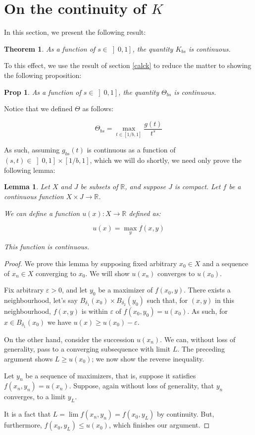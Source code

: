 \documentclass[11pt, reqno]{amsart}
\newcommand{\R}{\mathbb{R}}
\newtheorem{lemma}{Lemma}
\newtheorem{theorem}{Theorem}
\newtheorem{prop}{Prop}
\begin{document}
\section{On the continuity of $K$}

In this section, we present the following result:

\begin{theorem}
As a function of $s \in \left]0, 1\right]$, the quantity $K_{bs}$ is continuous.
\end{theorem}

To this effect, we use the result of section \ref{calck} to reduce the matter to showing the following proposition:

\begin{prop}
As a function of $s \in \left]0, 1\right]$, the quantity $\Theta_{bs}$ is continuous.
\end{prop}

Notice that we defined $\Theta$ as follows:

\[ \Theta_{bs} = \max_{t \in \left[ 1/b, 1 \right]} \frac{g(t)}{t^s} \]

As such, assuming $g_{bs}(t)$ is continuous as a function of $(s, t) \in \left]0, 1\right] \times \left[1/b, 1\right]$, which we will do shortly, we need only prove the following lemma:

\begin{lemma}
Let $X$ and $J$ be subsets of $\R$, and suppose $J$ is compact. Let $f$ be a continuous function $X \times J \to \R$.

We can define a function $u(x) : X \to \R$ defined as:

\[ u(x) = \max_y f(x,y) \]

This function is continuous.
\end{lemma}

\begin{proof}
We prove this lemma by supposing fixed arbitrary $x_0 \in X$ and a sequence of $x_n \in X$ converging to $x_0$. We will show $u(x_n)$ converges to $u(x_0)$.

Fix arbitrary $\varepsilon > 0$, and let $y_0$ be a maximizer of $f(x_0, y)$. There exists a neighbourhood, let's say $B_{\delta_1}(x_0) \times B_{\delta_2}(y_0)$ such that, for $(x,y)$ in this neighbourhood, $f(x,y)$ is within $\varepsilon$ of $f(x_0, y_0) = u(x_0)$. As such, for $x \in B_{\delta_1}(x_0)$ we have $u(x) \geq u(x_0) - \varepsilon$.

On the other hand, consider the succession $u(x_n)$. We can, without loss of generality, pass to a converging subsequence with limit $L$. The preceding argument shows $L \geq u(x_0)$; we now show the reverse inequality.

Let $y_n$ be a sequence of maximizers, that is, suppose it satisfies $f(x_n, y_n) = u(x_n)$. Suppose, again without loss of generality, that $y_n$ converges, to a limit $y_L$.

It is a fact that $L = \lim f(x_n, y_n) = f(x_0, y_L)$ by continuity. But, furthermore, $f(x_0, y_L) \leq u(x_0)$, which finishes our argument.
\end{proof}
\end{document}
